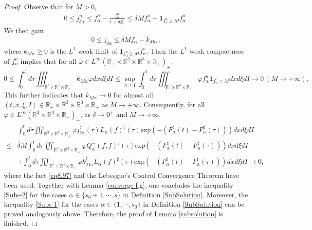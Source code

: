 \documentclass[reqno,11pt]{amsart}
\numberwithin{equation}{section}
\def\R{\mathbb{R}}
\def\exp{\mathrm{exp}}
\begin{document}
\begin{proof}
Observe that for $M > 0$,
\begin{equation*}
  \begin{aligned}
    0 \leq j^n_{\delta \alpha} \leq f^n_\alpha - \tfrac{f^n_\alpha}{1 + \delta f^n_\alpha } \leq \delta M f^n_\alpha + \mathbf{1}_{ f^n_\alpha \geq M } f^n_\alpha \,.
  \end{aligned}
\end{equation*}
We then gain
\begin{equation*}
  \begin{aligned}
    0 \leq j_{\delta \alpha} \leq \delta M f_\alpha + k_{M \alpha} \,,
  \end{aligned}
\end{equation*}
where $ k_{M \alpha} \geq 0 $ is the $L^1$ weak limit of $\mathbf{1}_{ f^n_\alpha \geq M } f^n_\alpha$. Then the $L^1$ weak compactness of $f^n_\alpha$ implies that for all $\varphi \in L^\infty (\R_+ \times \R^3 \times \R^3 \times \R_+)_+$,
\begin{equation*}
	0 \leq \int_{0}^{t} d \tau \iiint_{ \R^3 \times \R^3 \times \R_+} k_{M\alpha} \varphi dxd\xi dI \leq \sup \limits_{n \geq 1}  \int_{0}^{t} d \tau \iiint_{ \R^3 \times \R^3 \times \R_+} \varphi f^n_\alpha \mathbf{1}_{f^n_\alpha \geq M} dxd\xi dI \rightarrow 0 \ (M \rightarrow + \infty).
\end{equation*}
This further indicates that $ k_{M \alpha} \to 0$ for almost all $ (t, x, \xi, I) \in \R_+ \times \R^3 \times \R^3 \times \R_+ $ as $M \to + \infty$. Consequently, for all $\varphi \in L^\infty ( \R^3 \times \R^3 \times \R_+ )_+$, as $\delta \to 0^+$ and $M \to + \infty$,
\begin{equation}\label{j-0}
  \begin{aligned}
    & \int_{0}^{t}d \tau \iiint_{ \R^3 \times \R^3 \times \R_+} \varphi j^{\sharp}_{\delta \alpha }(\tau) L_\alpha (f)^\sharp(\tau) \exp(-(F^\sharp _{\alpha } (t)- F^\sharp _{\alpha } (\tau)))  dxd\xi dI \\
    \leq & \delta M \int_{0}^{t}d \tau \iiint_{ \R^3 \times \R^3 \times \R_+} \varphi Q_\alpha^- (f, f)^\sharp(\tau) \exp(-(F^\sharp _{\alpha } (t)- F^\sharp _{\alpha } (\tau)))  dxd\xi dI \\
    & + \int_{0}^{t}d\tau \iiint_{ \R^3 \times \R^3 \times \R_+} \varphi k^\sharp_{M\alpha} L_\alpha (f)^\sharp(\tau) \exp(-(F^\sharp _{\alpha } (t)- F^\sharp _{\alpha } (\tau))) dxd\xi dI \to 0,
  \end{aligned}
\end{equation}
where the fact \eqref{eq8.97} and the Lebesgue's Control Convergence Theorem have been used. Together with Lemma \ref{converge f,g}, one concludes the inequality \eqref{Subs-2} for the cases $\alpha \in \{ s_0 + 1, \cdots, s \}$ in Definition \ref{SubSolution}. Moreover, the inequality \eqref{Subs-1} for the cases $\alpha \in \{ 1, \cdots, s_0 \}$ in Definition \ref{SubSolution} can be proved analogously above. Therefore, the proof of Lemma \ref{subsolution} is finished.
\end{proof}
\end{document}
